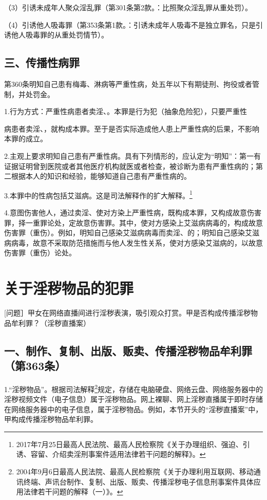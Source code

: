 （3）引诱未成年人聚众淫乱罪（第301条第2款。：比照聚众淫乱罪从重处罚）。

（4）引诱他人吸毒罪（第353条第1款。：引诱未成年人吸毒不是独立罪名，只是引诱他人吸毒罪的从重处罚情节）。

\subsection*{三、传播性病罪}

第360条明知自己患有梅毒、淋病等严重性病，处五年以下有期徒刑、拘役或者管制，并处罚金。

1.行为方式：严重性病患者卖淫、。本罪是行为犯（抽象危险犯），只要严重性

病患者卖淫、，就构成本罪。至于是否实际造成他人患上严重性病的后果，不影响本罪的成立。

2.主观上要求明知自己患有严重性病。具有下列情形的，应认定为“明知”：第一有证据证明曾到医院或者其他医疗机构就医或者检查，被诊断为患有严重性病的；第二根据本人的知识和经验，能够知道自己患有严重性病的。

3.本罪中的性病包括艾滋病。这是司法解释作的扩大解释。\footnote{2017年7月25日最高人民法院、最高人民检察院《关于办理组织、强迫、引诱、容留、介绍卖淫刑事案件适用法律若干问题的解释》。}

4.意图伤害他人，通过卖淫、使对方染上严重性病，既构成本罪，又构成故意伤害罪，择一重罪论处，定故意伤害罪。其中，使对方感染上艾滋病病毒的，构成故意伤害罪（重伤）。例如，明知自己感染艾滋病病毒而卖淫、的；明知自己感染艾滋病病毒，故意不采取防范措施而与他人发生性关系，使对方感染艾滋病的，以故意伤害罪（重伤）论处。

\section{关于淫秽物品的犯罪}

[问题］甲女在网络直播间进行淫秽表演，吸引观众打赏。甲是否构成传播淫秽物品牟利罪？（淫秽直播案）

\subsection*{一、制作、复制、出版、贩卖、传播淫秽物品牟利罪（第363条）}

1.“淫秽物品”。根据司法解释\footnote{2004年9月6日最高人民法院、最高人民检察院《关于办理利用互联网、移动通讯终端、声讯台制作、复制、出版、贩卖、传播淫秽电子信息刑事案件具体应用法律若干问题的解释（一）》。}规定，存储在电脑硬盘、网络云盘、网络服务器中的淫秽视频文件（电子信息）属于淫秽物品。网上裸聊、网上淫秽直播属于即时存储在网络服务器中的电子信息，属于淫秽物品。例如，本节开头的“淫秽直播案”中，甲构成传播淫秽物品牟利罪。

